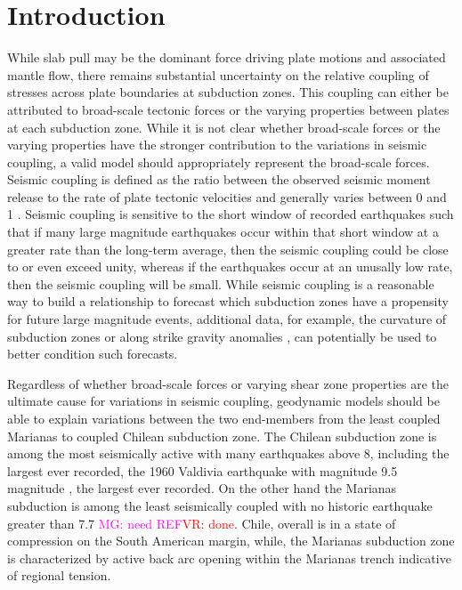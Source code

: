 \documentclass[12pt]{article}
\newcommand{\mgnote}[1]{\textcolor{magenta}{MG: #1}}
\newcommand{\vrnote}[1]{\textcolor{red}{VR: #1}}
\begin{document}
\section{Introduction}
While slab pull may be the dominant force driving plate motions and associated mantle flow, there remains substantial uncertainty on the relative coupling of stresses across plate boundaries at subduction zones. This coupling can either be attributed to broad-scale tectonic forces or the varying properties between plates at each subduction zone. While it is not clear whether broad-scale forces or the varying properties have the stronger contribution to the variations in seismic coupling, a valid model should appropriately represent the broad-scale forces. 
Seismic coupling is defined as the ratio between the observed seismic moment release to the rate of plate tectonic velocities and generally varies between 0 and 1 \citep{davies1971regional}. 
Seismic coupling is sensitive to the short window of recorded earthquakes such that if many large magnitude earthquakes occur within that short window 
at a greater rate than the long-term average, then the seismic coupling could be close to or even exceed unity, whereas if the earthquakes occur at an unusally low rate, then the seismic coupling will be small.  While seismic coupling is a reasonable way to build a relationship to forecast which subduction zones have a propensity for future large magnitude events, additional data, for example, the curvature of subduction zones \citep{bletery2016mega} or along strike gravity anomalies \citep{song2003large}, 
can potentially be used to better condition such forecasts. 


Regardless of whether broad-scale forces or varying shear zone properties are the ultimate cause for variations in seismic coupling, geodynamic models should be able to explain variations between the two end-members from the least coupled Marianas to coupled Chilean subduction zone. The Chilean subduction zone is among the most seismically active with many earthquakes above 8, including the largest ever recorded, the 1960 Valdivia earthquake with magnitude 9.5 magnitude \citep{kanamori1974},
the largest ever recorded. On the other hand the Marianas subduction is among the least seismically coupled with no historic earthquake greater than 7.7 \citep{doi:10.1130/G24402A.1}\mgnote{ need REF}\vrnote{done}. 
Chile, overall is in a state of compression on the South American margin, while, the Marianas subduction zone is characterized by active back arc opening within the Marianas trench indicative of regional tension.
\end{document}
